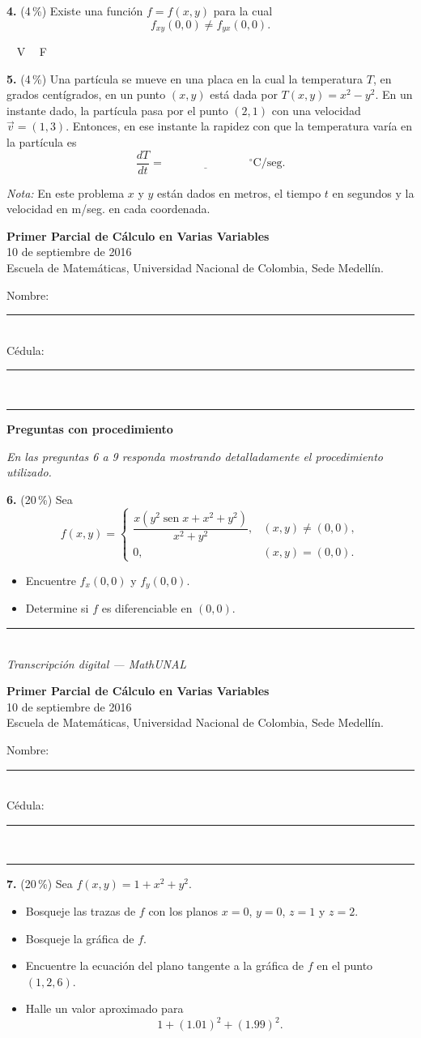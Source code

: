 \documentclass[11pt]{article}
\newcommand{\examheader}{%
  \noindent
  \begin{minipage}[t]{0.62\linewidth}
    {\bfseries\large Primer Parcial de C\'alculo en Varias Variables}\\
    {\small 10 de septiembre de 2016}\\
    {\small Escuela de Matem\'aticas, Universidad Nacional de Colombia, Sede Medell\'in.}
  \end{minipage}%
  \hfill
  \begin{minipage}[t]{0.33\linewidth}
    \raggedleft\small
    Nombre: \rule{2.8cm}{0.4pt}\\[4pt]
    C\'edula: \rule{2.8cm}{0.4pt}
  \end{minipage}\\[4pt]
  \rule{\linewidth}{0.6pt}
}
\newcommand{\examfooter}{%
  \vfill
  \rule{\linewidth}{0.4pt}\\[1pt]
  {\scriptsize\textit{Transcripci\'on digital --- MathUNAL}\hfill\textcolor{unalblue}{\textbf{\thepage}}}
}
\begin{document}
\bigskip
\noindent\textbf{4.} (4\,\%) Existe una funci\'on $f=f(x,y)$ para la cual
$$f_{xy}(0,0) \neq f_{yx}(0,0).$$

\hspace{2cm}$\boxed{\phantom{V}}$ V \qquad $\boxed{\phantom{V}}$ F

\bigskip
\noindent\textbf{5.} (4\,\%) Una part\'icula se mueve en una placa en la cual la temperatura $T$, en grados cent\'igrados, en un punto $(x,y)$ est\'a dada por $T(x,y) = x^2 - y^2$. En un instante dado, la part\'icula pasa por el punto $(2,1)$ con una velocidad $\vec v = (1,3)$. Entonces, en ese instante la rapidez con que la temperatura var\'ia en la part\'icula es
$$\frac{dT}{dt} = \underline{\hspace{3cm}} \; {}^{\circ}\text{C/seg}.$$

\textit{Nota:} En este problema $x$ y $y$ est\'an dados en metros, el tiempo $t$ en segundos y la velocidad en m/seg. en cada coordenada.

\newpage
\examheader
\vspace{2pt}

\textbf{Preguntas con procedimiento}

\textit{En las preguntas 6 a 9 responda mostrando detalladamente el procedimiento utilizado.}

\bigskip
\noindent\textbf{6.} (20\,\%) Sea
$$
f(x,y)=
\begin{cases}
\dfrac{x(y^2\operatorname{sen}x + x^2+y^2)}{x^2+y^2}, & (x,y)\neq (0,0),\\[6pt]
0, & (x,y)=(0,0).
\end{cases}
$$
\begin{itemize}[itemsep=1pt,topsep=2pt]
  \item Encuentre $f_x(0,0)$ y $f_y(0,0)$.
  \item Determine si $f$ es diferenciable en $(0,0)$.
\end{itemize}

\vfill
\examfooter
\newpage
\examheader
\vspace{2pt}

\noindent\textbf{7.} (20\,\%) Sea $f(x,y) = 1+x^2+y^2$.
\begin{itemize}[itemsep=1pt,topsep=2pt]
  \item Bosqueje las trazas de $f$ con los planos $x=0$, $y=0$, $z=1$ y $z=2$.
  \item Bosqueje la gr\'afica de $f$.
  \item Encuentre la ecuaci\'on del plano tangente a la gr\'afica de $f$ en el punto $(1,2,6)$.
  \item Halle un valor aproximado para
  $$1+(1.01)^2+(1.99)^2.$$
\end{itemize}
\end{document}
